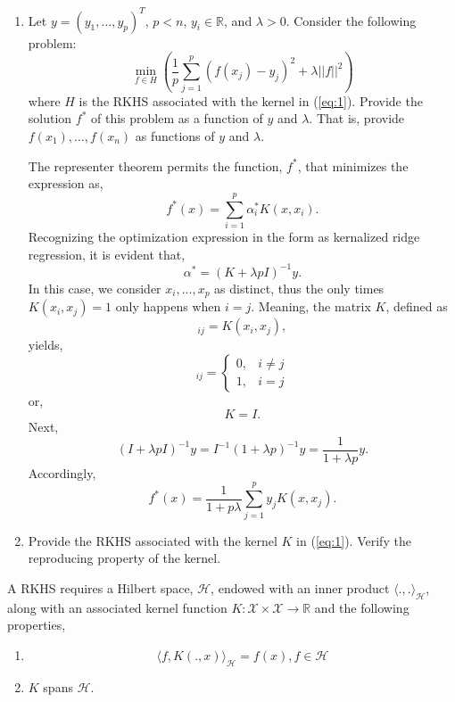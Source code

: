\documentclass[12pt]{article}
\begin{document}
\begin{enumerate}
\newpage
\item 
Let $y=(y_1,\ldots,y_p)^T$, $p<n$, $y_i \in \mathbb{R}$, and $\lambda >0$. 
Consider the following problem: 
\begin{equation}
\min_{f \in H}\left( \frac{1}{p}\sum_{j=1}^p (f(x_j)-y_j)^2 + \lambda||f||^2\right)
\end{equation}
where $H$ is the RKHS associated with the kernel in (\ref{eq:1}). Provide the solution $f^*$ of this problem as a function of $y$ and $\lambda$.  
That is, provide $f(x_1),\ldots,f(x_n)$ as functions of $y$ and $\lambda$.

The representer theorem permits the function, $f^*$, that minimizes the expression as,
\begin{equation}
f^*(x) = \sum_{i=1}^{p} \alpha^*_i K(x, x_i).
\end{equation}
Recognizing the optimization expression in the form as kernalized ridge regression, it is evident that,
\begin{equation}
\alpha^* = \left( K + \lambda p I \right)^{-1} y.
\end{equation}
In this case, we consider $x_i, ..., x_p$ as distinct, thus the only times $K(x_i, x_j) = 1$ only happens when $i=j$. Meaning, the matrix $K$, defined as
\begin{equation}
[K]_{ij} = K(x_i, x_j),
\end{equation}
yields,
\begin{equation}
[K]_{ij}=\left\{\begin{array}{ll}{0,} & {i \ne j} \\ {1,} & {i =  j}\end{array}\right.
\end{equation}
or, 
\begin{equation}
K = I.
\end{equation}
Next,
\begin{equation}
(I + \lambda p I)^{-1}y = I^{-1}(1 + \lambda p)^{-1}y = \frac{1}{1+\lambda p}y.
\end{equation}
Accordingly,
\begin{equation}
f^*(x)= \frac{1}{1+p \lambda} \sum_{j=1}^{p} y_j K(x, x_j).
\end{equation}
\newpage

\item Provide the RKHS associated with the kernel $K$ in (\ref{eq:1}). Verify the reproducing property of the kernel.  
\end{enumerate}
A RKHS requires a Hilbert space, $\mathcal H$, endowed with an inner product $\langle . , . \rangle_{\mathcal H}$, along with an associated kernel function $K: \mathcal X \times \mathcal X \rightarrow \mathbb R$ and the following properties,
\begin{enumerate}
\item \[ \langle f, K(., x) \rangle_{\mathcal H}= f(x), f \in \mathcal H \]
\item $K$ spans $\mathcal H$.
\end{enumerate}
\end{document}
